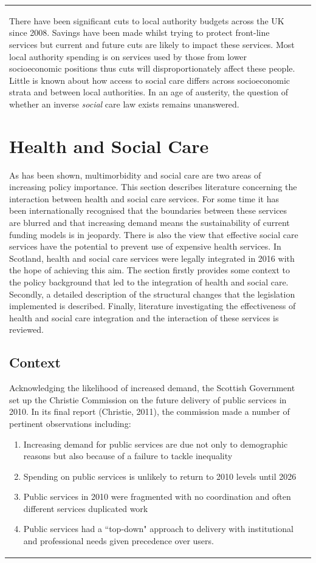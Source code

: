 \documentclass[12pt,a4paper,oneside,table]{report}
\begin{document}
\begin{tabular}[t]{ll}
There have been significant cuts to local authority budgets across the
UK since 2008. Savings have been made whilst trying to protect
front-line services but current and future cuts are likely to impact
these services. Most local authority spending is on services used by
those from lower socioeconomic positions thus cuts will
disproportionately affect these people. Little is known about how access
to social care differs across socioeconomic strata and between local
authorities. In an age of austerity, the question of whether an inverse
\textit{social} care law exists remains unanswered.

\newpage

\section{Health and Social Care}\label{sec:hsc-interaction}

As has been shown, multimorbidity and social care are two areas of
increasing policy importance. This section describes literature
concerning the interaction between health and social care services. For
some time it has been internationally recognised that the boundaries
between these services are blurred and that increasing demand means the
sustainability of current funding models is in jeopardy. There is also
the view that effective social care services have the potential to
prevent use of expensive health services. In Scotland, health and social
care services were legally integrated in 2016 with the hope of achieving
this aim. The section firstly provides some context to the policy
background that led to the integration of health and social care.
Secondly, a detailed description of the structural changes that the
legislation implemented is described. Finally, literature investigating
the effectiveness of health and social care integration and the
interaction of these services is reviewed.

\subsection{Context}\label{subsec:policy}

Acknowledging the likelihood of increased demand, the Scottish
Government set up the Christie Commission on the future delivery of
public services in 2010. In its final report (Christie, 2011), the
commission made a number of pertinent observations including:

\begin{enumerate}[noitemsep, label={\alph*)}]
\item Increasing demand for public services are due not only to demographic reasons but also because of a failure to tackle inequality
\item Spending on public services is unlikely to return to 2010 levels until 2026
\item Public services in 2010 were fragmented with no coordination and often different services duplicated work
\item Public services had a ``top-down" approach to delivery with institutional and professional needs given precedence over users.
\end{enumerate}


\end{tabular}
\end{document}
